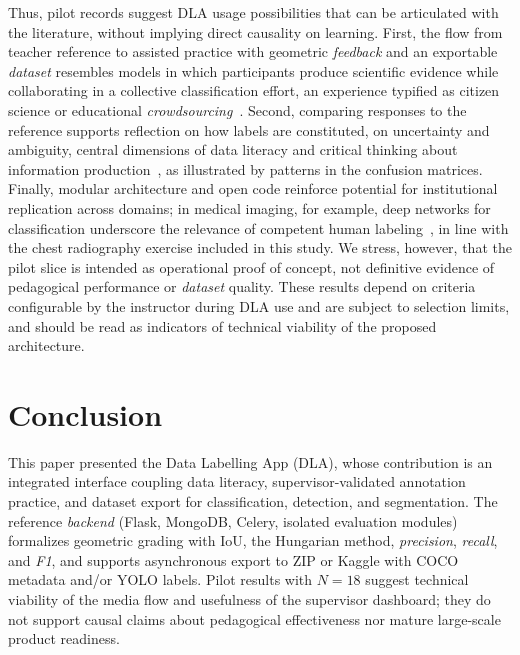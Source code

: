 \documentclass[runningheads]{llncs}
\begin{document}
Thus, pilot records suggest DLA usage possibilities that can be articulated with the literature, without implying direct causality on learning. First, the flow from teacher reference to assisted practice with geometric \emph{feedback} and an exportable \textit{dataset} resembles models in which participants produce scientific evidence while collaborating in a collective classification effort, an experience typified as citizen science or educational \emph{crowdsourcing}~\cite{wiggins2011citizen}. Second, comparing responses to the reference supports reflection on how labels are constituted, on uncertainty and ambiguity, central dimensions of data literacy and critical thinking about information production~\cite{wolff2016data,pangrazio2019personal}, as illustrated by patterns in the confusion matrices. Finally, modular architecture and open code reinforce potential for institutional replication across domains; in medical imaging, for example, deep networks for classification underscore the relevance of competent human labeling~\cite{esteva2017dermatologist}, in line with the chest radiography exercise included in this study. We stress, however, that the pilot slice is intended as operational proof of concept, not definitive evidence of pedagogical performance or \textit{dataset} quality. These results depend on criteria configurable by the instructor during DLA use and are subject to selection limits, and should be read as indicators of technical viability of the proposed architecture.

\section{Conclusion}

This paper presented the Data Labelling App (DLA), whose contribution is an integrated interface coupling data literacy, supervisor-validated annotation practice, and dataset export for classification, detection, and segmentation. The reference \emph{backend} (Flask, MongoDB, Celery, isolated evaluation modules) formalizes geometric grading with IoU, the Hungarian method, \emph{precision}, \emph{recall}, and \emph{F1}, and supports asynchronous export to ZIP or Kaggle with COCO metadata and/or YOLO labels. Pilot results with $N=18$ suggest technical viability of the media flow and usefulness of the supervisor dashboard; they do not support causal claims about pedagogical effectiveness nor mature large-scale product readiness.
\end{document}
